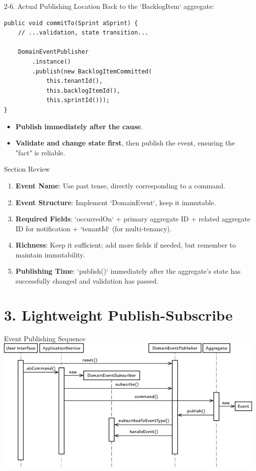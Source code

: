 \documentclass{beamer}
\begin{document}
\begin{frame}[fragile]{2-6. Actual Publishing Location}
  Back to the `BacklogItem` aggregate:
  \lstset{language=Java}
  \begin{lstlisting}
public void commitTo(Sprint aSprint) {
    // ...validation, state transition...

    DomainEventPublisher
        .instance()
        .publish(new BacklogItemCommitted(
            this.tenantId(),
            this.backlogItemId(),
            this.sprintId()));
}
  \end{lstlisting}
  \begin{itemize}
    \item<1-> \textbf{Publish immediately after the cause}. 
    \item<2-> \textbf{Validate and change state first}, then publish the event, ensuring the "fact" is reliable.
  \end{itemize}
\end{frame}

\begin{frame}{Section Review}
  \begin{enumerate}
    \item \textbf{Event Name}: Use past tense, directly corresponding to a command.
    \item \textbf{Event Structure}: Implement `DomainEvent`, keep it immutable.
    \item \textbf{Required Fields}: `occurredOn` + primary aggregate ID + related aggregate ID for notification + `tenantId` (for multi-tenancy).
    \item \textbf{Richness}: Keep it sufficient; add more fields if needed, but remember to maintain immutability.
    \item \textbf{Publishing Time}: `publish()` immediately after the aggregate's state has successfully changed and validation has passed.
  \end{enumerate}
\end{frame}


\section{3. Lightweight Publish-Subscribe}

\begin{frame}{Event Publishing Sequence}
  \includegraphics[width=\textwidth]{img/DomainEvent_SequenceDiagram.png}
\end{frame}
\end{document}

